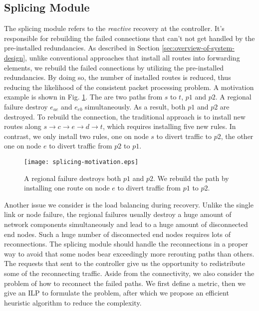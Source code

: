 \documentclass[10pt,journal]{IEEEtran}
\begin{document}
\subsection{Splicing Module}\label{sec:splicing-module}
The splicing module refers to the \emph{reactive} recovery at the controller. It's responsible for rebuilding the failed connections that can't not get handled by the pre-installed redundancies. As described in Section \ref{sec:overview-of-system-design}, unlike conventional approaches that install all routes into forwarding elements, we rebuild the failed connections by utilizing the pre-installed redundancies. By doing so, the number of installed routes is reduced, thus reducing the likelihood of the consistent packet processing problem. A motivation example is shown in Fig. \ref{fig:splicing-motivation}. The are two paths from $s$ to $t$, $p1$ and $p2$. A regional failure destroy $e_{ae}$ and $e_{eb}$ simultaneously. As a result, both $p1$ and $p2$ are destroyed. To rebuild the connection, the traditional approach is to install new routes along $s\rightarrow c\rightarrow e\rightarrow d\rightarrow t$, which requires installing five new rules. In contrast, we only install two rules, one on node $s$ to divert traffic to $p2$, the other one on node $e$ to divert traffic from $p2$ to $p1$.
\begin{figure}
\centering
		\texttt{[image: splicing-motivation.eps]}
	\caption{A regional failure destroys both $p1$ and $p2$. We rebuild the path by installing one route on node $e$ to divert traffic from $p1$ to $p2$.}
	\label{fig:splicing-motivation}
\end{figure}

Another issue we consider is the load balancing during recovery. Unlike the single link or node failure, the regional failures usually destroy a huge amount of network components simultaneously and lead to a huge amount of disconnected end nodes. Such a huge number of disconnected end nodes requires lots of reconnections. The splicing module should handle the reconnections in a proper way to avoid that some nodes bear exceedingly more rerouting paths than others. The requests that sent to the controller give us the opportunity to redistribute some of the reconnecting traffic. Aside from the connectivity, we also consider the problem of how to reconnect the failed paths. We first define a metric, then we give an ILP to formulate the problem, after which we propose an efficient heuristic algorithm to reduce the complexity.
\end{document}
